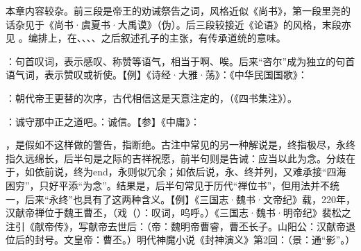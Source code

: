 {
本章内容较杂。前三段是帝王的劝诫祭告之词，风格近似《尚书》，第一段里尧的话杂见于《尚书·虞夏书·大禹谟》（伪）。后三段较接近《论语》的风格，末段亦见 。编排上，在、、、、之后叙述孔子的主张，有传承道统的意味。
\begin{lyitemize}
\item {}：句首叹词，表示感叹、称赞等语气，相当于啊、唉。后来“咨尔”成为独立的句首语气词，表示赞叹或祈使。【例】《诗经·大雅·荡》：《中华民国国歌》：
\item {}：朝代帝王更替的次序，古代相信这是天意注定的，（《四书集注》）。%
\item {}：诚守那中正之道吧。：诚信。【参】《中庸》：

，是假如不这样做的警告，指断绝。古注中常见的另一种解说是，终指极尽，永终指久远绵长，后半句是之际的吉祥祝愿，前半句则是告诫：应当以此为念。分歧在于，如依前说，终为end，永则似冗余；如依后说，永、终并列，又难承接“四海困穷”，只好平添“为念”。结果是，后半句常见于历代“禅位书”，但用法并不统一，后来“永终”也具有了这两种含义。【例】《三国志·魏书·文帝纪》载，220年，汉献帝禅位于魏王曹丕，（戏（）：叹词，呜呼。）《三国志·魏书·明帝纪》裴松之注引《献帝传》，写献帝去世后：（帝：魏明帝曹睿，曹丕长子。山阳公：汉献帝退位后的封号。文皇帝：曹丕。）明代神魔小说《封神演义》第2回：（景：通“影”。）


\end{lyitemize}}
